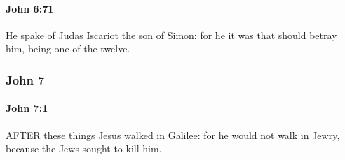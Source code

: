 		\paragraph{John 6:71} %
			\label{JOHN-6-71}

			He spake of Judas Iscariot the son of Simon: for he it was that should betray him, being one of the twelve.

			\begin{framed}
			\scriptsize
				\begin{compactdesc}
					\item[SBLG] 
				\end{compactdesc}
			\end{framed}

	\subsubsection{John 7} %
		\label{JOHN-7}
		
		\paragraph{John 7:1} %
			\label{JOHN-7-1}

			AFTER these things Jesus walked in Galilee: for he would not walk in Jewry, because the Jews sought to kill him.

